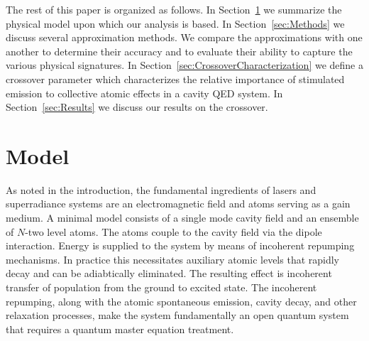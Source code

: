 \documentclass[aps,
twocolumn,
showpacs,
superscriptaddress,groupedaddress]{revtex4}
\begin{document}
The rest of this paper is organized as follows.  In
Section~\ref{sec:Model} we summarize the physical model upon which our
analysis is based. In Section~\ref{sec:Methods} we discuss several
approximation methods.  We compare the approximations with one another
to determine their accuracy and to evaluate their ability to capture the
various physical signatures. In
Section~\ref{sec:CrossoverCharacterization} we define a crossover
parameter which characterizes the relative importance of stimulated
emission to collective atomic effects in a cavity QED system.  In
Section~\ref{sec:Results} we discuss our results on the crossover.


\section{Model}
\label{sec:Model}

As noted in the introduction, the fundamental ingredients of lasers
and superradiance systems are an electromagnetic field and atoms
serving as a gain medium.  A minimal model consists of a single mode
cavity field and an ensemble of $N$-two level atoms.  The atoms couple
to the cavity field via the dipole interaction.  Energy is supplied to
the system by means of incoherent repumping mechanisms.  In practice
this necessitates auxiliary atomic levels that rapidly decay and can
be adiabtically eliminated. The resulting effect is incoherent
transfer of population from the ground to excited state. The
incoherent repumping, along with the atomic spontaneous emission,
cavity decay, and other relaxation processes, make the system
fundamentally an open quantum system that requires a quantum master
equation treatment.
\end{document}

